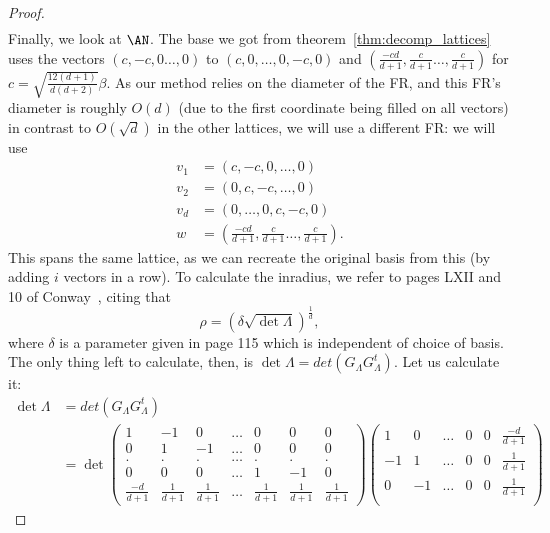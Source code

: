 \begin{proof}
\begin{align*}
    \end{align*}
    Finally, we look at $\AN$. The base we got from theorem~\ref{thm:decomp_lattices} uses the vectors $\left(c,-c,0\dots,0\right)$ to $\left(c,0,\dots,0,-c,0\right)$ and $\left(\frac{-cd}{d+1},\frac{c}{d+1}\dots,\frac{c}{d+1}\right)$ for $c=\sqrt{\frac{12\left(d+1\right)}{d\left(d+2\right)}}\beta$. As our method relies on the diameter of the FR, and this FR's diameter is roughly $O\left(d\right)$ (due to the first coordinate being filled on all vectors) in contrast to $O\left(\sqrt{d}\right)$ in the other lattices, we will use a different FR: we will use
    \begin{align*}
        v_1&=\left(c,-c,0,\dots,0\right)\\
        v_2&=\left(0,c,-c,\dots,0\right)\\
        v_d&=\left(0,\dots,0,c,-c,0\right)\\
        w&=\left(\frac{-cd}{d+1},\frac{c}{d+1}\dots,\frac{c}{d+1}\right).
    \end{align*}
    This spans the same lattice, as we can recreate the original basis from this (by adding $i$ vectors in a row).  To calculate the inradius, we refer to pages LXII and 10 of Conway~\cite{conway2013sphere}, citing that 
    \[
        \rho = \left(\delta\sqrt{\det{\Lambda}}\right)^{\frac{1}{d}},
    \]
    where $\delta$ is a parameter given in page 115 which is independent of choice of basis. The only thing left to calculate, then, is $\det{\Lambda}=det\left(G_\Lambda G_\Lambda^t\right)$. Let us calculate it:
    \begin{align*}
        \det{\Lambda}&=det\left(G_\Lambda G_\Lambda^t\right)\\
        &=\det\begin{pmatrix}
            1 & -1 &  0  & \dots & 0 & 0 & 0 \\
            0 & 1  &  -1 & \dots & 0 & 0 & 0 \\
            . & .  &  . & \dots & . & .  & .\\
            0 & 0  &  0 & \dots & 1 & -1 & 0\\
            \frac{-d}{d+1} & \frac{1}{d+1} & \frac{1}{d+1} & \dots & \frac{1}{d+1} & \frac{1}{d+1} & \frac{1}{d+1}
        \end{pmatrix}
        \begin{pmatrix}
            1 & 0 & \dots & 0 & 0 & \frac{-d}{d+1} \\
            -1 & 1 & \dots & 0 & 0 & \frac{1}{d+1} \\
            0 & -1 & \dots & 0 & 0 & \frac{1}{d+1} \\

\end{pmatrix}
\end{align*}
\end{proof}
